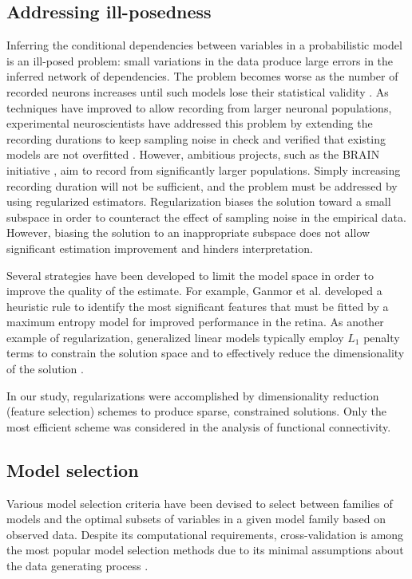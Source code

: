 \subsection*{Addressing ill-posedness}
Inferring the conditional dependencies between variables in a probabilistic model is an ill-posed problem: small variations in the data produce large errors in the inferred network of dependencies. The problem becomes worse as the number of  recorded neurons increases until such models lose their statistical validity \cite{Roudi:2009}.  As techniques have improved to allow recording from larger neuronal populations, experimental neuroscientists have addressed this problem by extending the recording durations to keep sampling noise in check and verified that existing models are not overfitted \cite{Tkacik:2013}. However, ambitious projects, such as the BRAIN initiative  \cite{Alivisatos:2013}, aim to record from significantly larger populations. Simply increasing recording duration will not be sufficient, and the problem must be addressed by using regularized estimators. Regularization biases the solution toward a small subspace in order to counteract the effect of  sampling noise in the empirical data. However, biasing the solution to an inappropriate subspace does not allow significant estimation improvement and hinders interpretation.

Several strategies have been developed to limit the model space in order to improve the quality of the estimate. For example, Ganmor et al. \cite{Ganmor:2011} developed a heuristic rule to identify the most significant features that must be fitted by a maximum entropy model for improved performance in the retina. As another example of regularization, generalized linear models typically employ $L_1$ penalty terms to constrain the solution space and to effectively reduce the dimensionality of the solution \cite{Pillow:2008}.

In our study, regularizations were accomplished by dimensionality reduction (feature selection) schemes to produce sparse, constrained solutions. Only the most efficient scheme was considered in the analysis of functional connectivity.

\subsection*{Model selection}
Various model selection criteria have been devised to select between families of models and the optimal subsets of variables in a given model family based on observed data. Despite its computational requirements, cross-validation is among the most popular model selection methods due to its minimal assumptions about the data generating process \cite{Arlot:2010}.

